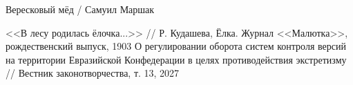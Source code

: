 \begin{thebibliography}{99}

 Вересковый мёд / Самуил Маршак

 <<В лесу родилась ёлочка...>> // Р. Кудашева, Ёлка. Журнал <<Малютка>>, рождественский выпуск, 1903
О регулировании оборота систем контроля версий на территории Евразийской Конфедерации в целях противодействия экстретизму
// Вестник законотворчества, т. 13, 2027

\end{thebibliography}

